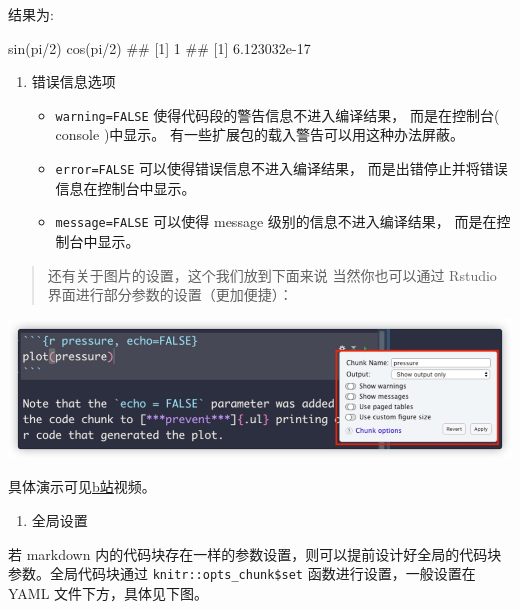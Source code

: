 \documentclass[
]{book}
\newenvironment{Shaded}{\begin{snugshade}}{\end{snugshade}}
\newcommand{\FunctionTok}[1]{\textcolor[rgb]{0.00,0.00,0.00}{#1}}
\newcommand{\NormalTok}[1]{#1}
\providecommand{\tightlist}{%
  \setlength{\itemsep}{0pt}\setlength{\parskip}{0pt}}
\begin{document}
结果为:

\begin{Shaded}
\begin{Highlighting}[]
\NormalTok{sin(pi/2)}
\NormalTok{cos(pi/2)}
\FunctionTok{\#\# [1] 1}
\FunctionTok{\#\# [1] 6.123032e{-}17}
\end{Highlighting}
\end{Shaded}

\begin{enumerate}
\def\labelenumi{\arabic{enumi}.}
\setcounter{enumi}{5}
\item
  错误信息选项

  \begin{itemize}
  \item
    \texttt{warning=FALSE} 使得代码段的警告信息不进入编译结果，
    而是在控制台( console )中显示。
    有一些扩展包的载入警告可以用这种办法屏蔽。
  \item
    \texttt{error=FALSE} 可以使得错误信息不进入编译结果，
    而是出错停止并将错误信息在控制台中显示。
  \item
    \texttt{message=FALSE} 可以使得 message 级别的信息不进入编译结果，
    而是在控制台中显示。
  \end{itemize}
\end{enumerate}

\begin{quote}
还有关于图片的设置，这个我们放到下面来说 当然你也可以通过 Rstudio
界面进行部分参数的设置（更加便捷）：
\end{quote}

\includegraphics{images/paste-E987C1F4.png}

具体演示可见\href{https://www.bilibili.com/video/BV1ib4y1X7r9}{b站}视频。

\begin{enumerate}
\def\labelenumi{\arabic{enumi}.}
\setcounter{enumi}{6}
\tightlist
\item
  全局设置
\end{enumerate}

若 markdown
内的代码块存在一样的参数设置，则可以提前设计好全局的代码块参数。全局代码块通过
\texttt{knitr::opts\_chunk\$set} 函数进行设置，一般设置在 YAML
文件下方，具体见下图。
\end{document}
